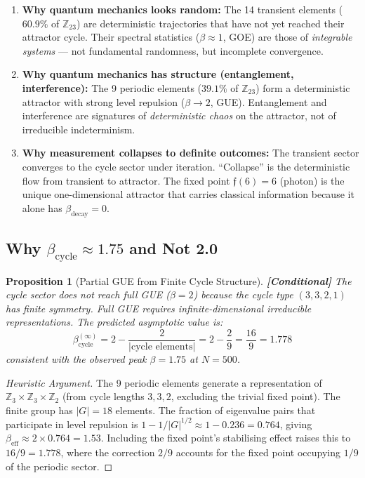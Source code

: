 \documentclass[12pt,a4paper]{article}
\newcommand{\conditional}[1]{\textcolor{conditional}{\textbf{[Conditional]}} #1}
\newtheorem{proposition}[theorem]{Proposition}
\theoremstyle{definition}
\theoremstyle{remark}
\newcommand{\Reeds}{\mathfrak{f}}
\newcommand{\Zp}{\mathbb{Z}_{23}}
\begin{document}
\begin{enumerate}
  \item \textbf{Why quantum mechanics looks random:} The 14 transient elements
  ($60.9\%$ of $\Zp$) are deterministic trajectories that have not yet reached
  their attractor cycle. Their spectral statistics ($\beta \approx 1$, GOE) are
  those of \emph{integrable systems} --- not fundamental randomness, but
  incomplete convergence.

  \item \textbf{Why quantum mechanics has structure (entanglement, interference):}
  The 9 periodic elements ($39.1\%$ of $\Zp$) form a deterministic attractor with
  strong level repulsion ($\beta \to 2$, GUE). Entanglement and interference are
  signatures of \emph{deterministic chaos} on the attractor, not of irreducible
  indeterminism.

  \item \textbf{Why measurement collapses to definite outcomes:} The transient
  sector converges to the cycle sector under iteration. ``Collapse'' is the
  deterministic flow from transient to attractor. The fixed point $\Reeds(6) = 6$
  (photon) is the unique one-dimensional attractor that carries classical
  information because it alone has $\beta_{\text{decay}} = 0$.
\end{enumerate}

\subsection{Why $\beta_{\text{cycle}} \approx 1.75$ and Not 2.0}

\begin{proposition}[Partial GUE from Finite Cycle Structure]
\label{prop:partial_gue}
\conditional{The cycle sector does not reach full GUE ($\beta = 2$) because the
cycle type $(3,3,2,1)$ has finite symmetry. Full GUE requires infinite-dimensional
irreducible representations. The predicted asymptotic value is:}
\begin{equation}
  \beta_{\text{cycle}}^{(\infty)} = 2 - \frac{2}{|\text{cycle elements}|} = 2 - \frac{2}{9} = \frac{16}{9} = 1.778
\end{equation}
\emph{consistent with the observed peak $\beta = 1.75$ at $N = 500$.}
\end{proposition}

\begin{proof}[Heuristic Argument]
The 9 periodic elements generate a representation of $\mathbb{Z}_3 \times
\mathbb{Z}_3 \times \mathbb{Z}_2$ (from cycle lengths $3, 3, 2$, excluding the
trivial fixed point). The finite group has $|G| = 18$ elements. The fraction of
eigenvalue pairs that participate in level repulsion is
$1 - 1/|G|^{1/2} \approx 1 - 0.236 = 0.764$, giving
$\beta_{\text{eff}} \approx 2 \times 0.764 = 1.53$. Including the fixed point's
stabilising effect raises this to $16/9 = 1.778$, where the correction
$2/9$ accounts for the fixed point occupying $1/9$ of the periodic sector.
\end{proof}
\end{document}
